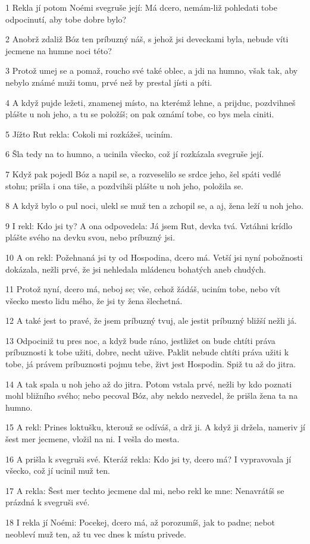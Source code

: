 \par 1 Rekla jí potom Noémi svegruše její: Má dcero, nemám-liž pohledati tobe odpocinutí, aby tobe dobre bylo?
\par 2 Anobrž zdaliž Bóz ten príbuzný náš, s jehož jsi deveckami byla, nebude víti jecmene na humne noci této?
\par 3 Protož umej se a pomaž, roucho své také oblec, a jdi na humno, však tak, aby nebylo známé muži tomu, prvé než by prestal jísti a píti.
\par 4 A když pujde ležeti, znamenej místo, na kterémž lehne, a prijduc, pozdvihneš plášte u noh jeho, a tu se položíš; on pak oznámí tobe, co bys mela ciniti.
\par 5 Jížto Rut rekla: Cokoli mi rozkážeš, uciním.
\par 6 Šla tedy na to humno, a ucinila všecko, což jí rozkázala svegruše její.
\par 7 Když pak pojedl Bóz a napil se, a rozveselilo se srdce jeho, šel spáti vedlé stohu; prišla i ona tiše, a pozdvihši plášte u noh jeho, položila se.
\par 8 A když bylo o pul noci, ulekl se muž ten a zchopil se, a aj, žena leží u noh jeho.
\par 9 I rekl: Kdo jsi ty? A ona odpovedela: Já jsem Rut, devka tvá. Vztáhni krídlo plášte svého na devku svou, nebo príbuzný jsi.
\par 10 A on rekl: Požehnaná jsi ty od Hospodina, dcero má. Vetší jsi nyní pobožnosti dokázala, nežli prvé, že jsi nehledala mládencu bohatých aneb chudých.
\par 11 Protož nyní, dcero má, neboj se; vše, cehož žádáš, uciním tobe, nebo vít všecko mesto lidu mého, že jsi ty žena šlechetná.
\par 12 A také jest to pravé, že jsem príbuzný tvuj, ale jestit príbuzný bližší nežli já.
\par 13 Odpociniž tu pres noc, a když bude ráno, jestližet on bude chtíti práva príbuznosti k tobe užiti, dobre, necht užive. Paklit nebude chtíti práva užiti k tobe, já právem príbuznosti pojmu tebe, živt jest Hospodin. Spiž tu až do jitra.
\par 14 A tak spala u noh jeho až do jitra. Potom vstala prvé, nežli by kdo poznati mohl bližního svého; nebo pecoval Bóz, aby nekdo nezvedel, že prišla žena ta na humno.
\par 15 A rekl: Prines loktušku, kterouž se odíváš, a drž ji. A když ji držela, nameriv jí šest mer jecmene, vložil na ni. I vešla do mesta.
\par 16 A prišla k svegruši své. Kteráž rekla: Kdo jsi ty, dcero má? I vypravovala jí všecko, což jí ucinil muž ten.
\par 17 A rekla: Šest mer techto jecmene dal mi, nebo rekl ke mne: Nenavrátíš se prázdná k svegruši své.
\par 18 I rekla jí Noémi: Pocekej, dcero má, až porozumíš, jak to padne; nebot neobleví muž ten, až tu vec dnes k místu privede.


